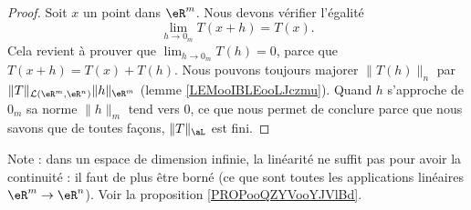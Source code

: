 \begin{proof}
      Soit $x$ un point dans $\eR^m$. Nous devons vérifier l'égalité
      \begin{equation}
       \lim_{h\to 0_m}T(x+h)=T(x).
      \end{equation}
      Cela revient à prouver que $\lim_{h\to 0_m}T(h)=0$, parce que $T(x+h)=T(x)+T(h)$. Nous pouvons toujours majorer $\|T(h)\|_n$ par $\|T\|_{\mathcal{L}(\eR^m,\eR^n)}\| h \|_{\eR^m}$ (lemme \ref{LEMooIBLEooLJczmu}). Quand $h$ s'approche de $ 0_m $ sa norme $\|h\|_m$ tend vers $0$, ce que nous permet de conclure parce que nous savons que de toutes façons, $\| T \|_{\aL}$ est fini.
\end{proof}

Note : dans un espace de dimension infinie, la linéarité ne suffit pas pour avoir la continuité : il faut de plus être borné (ce que sont toutes les applications linéaires \( \eR^m\to\eR^n\)). Voir la proposition \ref{PROPooQZYVooYJVlBd}.

